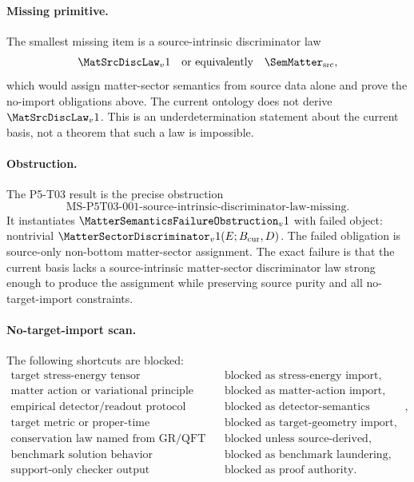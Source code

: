 \paragraph{Missing primitive.}
The smallest missing item is a source-intrinsic discriminator law
\[
  \MatSrcDiscLaw_v1
  \quad\text{or equivalently}\quad
  \SemMatter_{\mathrm{src}},
\]
which would assign matter-sector semantics from source data alone and prove
the no-import obligations above.  The current ontology does not derive
\(\MatSrcDiscLaw_v1\).  This is an underdetermination statement about the
current basis, not a theorem that such a law is impossible.

\paragraph{Obstruction.}
The P5-T03 result is the precise obstruction
\[
  \mathrm{MS\mbox{-}P5T03\mbox{-}001\mbox{-}source\mbox{-}intrinsic
  \mbox{-}discriminator\mbox{-}law\mbox{-}missing}.
\]
It instantiates \(\MatterSemanticsFailureObstruction_v1\) with failed object:
nontrivial \(\MatterSectorDiscriminator_v1(E;B_{\mathrm{cur}},D)\).  The
failed obligation is source-only non-bottom matter-sector assignment.  The
exact failure is that the current basis lacks a source-intrinsic matter-sector
discriminator law strong enough to produce the assignment while preserving
source purity and all no-target-import constraints.

\paragraph{No-target-import scan.}
The following shortcuts are blocked:
\[
\begin{array}{ll}
\text{target stress-energy tensor} & \text{blocked as stress-energy import},\\
\text{matter action or variational principle} & \text{blocked as matter-action import},\\
\text{empirical detector/readout protocol} & \text{blocked as detector-semantics import},\\
\text{target metric or proper-time normalization} & \text{blocked as target-geometry import},\\
\text{conservation law named from GR/QFT} & \text{blocked unless source-derived},\\
\text{benchmark solution behavior} & \text{blocked as benchmark laundering},\\
\text{support-only checker output} & \text{blocked as proof authority}.
\end{array}
\]


